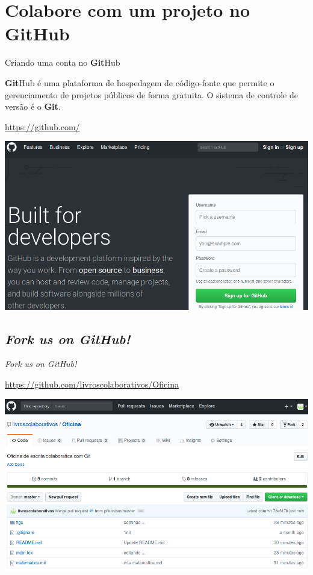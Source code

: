 \documentclass{beamer}
\begin{document}
\section{Colabore com um projeto no {\bf Git}Hub}

\begin{frame}{Criando uma conta no {\bf Git}Hub}
  \begin{center}
    {\bf Git}Hub é uma plataforma de hospedagem de código-fonte que permite o gerenciamento de projetos públicos de forma gratuita. O sistema de controle de versão é o {\bf Git}.
  \end{center}
  \begin{center}
    \url{https://github.com/}
    
    \includegraphics[scale=0.25]{./figs/SignUp_GitHub.png}
  \end{center}
\end{frame}

\subsection{{\it Fork us on GitHub!}}
\begin{frame}{{\it Fork us on GitHub!}}
  \begin{center}
    \url{https://github.com/livroscolaborativos/Oficina}

    \includegraphics[scale=0.3]{./figs/Fork_us_on_GitHub.png}
  \end{center}
\end{frame}
\end{document}
